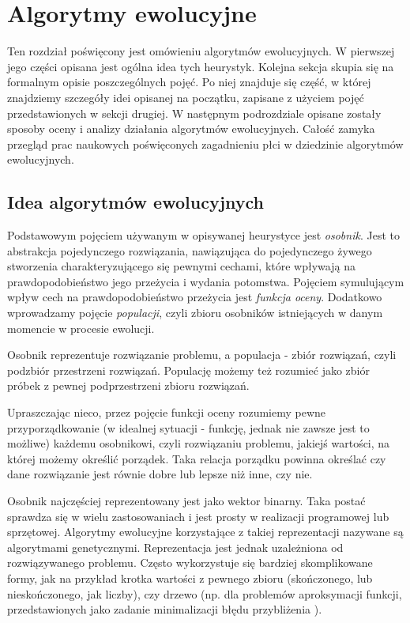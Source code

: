 \documentclass[./FM_mgr.tex]{subfiles}
\begin{document}
\chapter{Algorytmy ewolucyjne} \label{chapter:eaDesc}

Ten rozdział poświęcony jest omówieniu algorytmów ewolucyjnych.
W pierwszej jego części opisana jest ogólna idea tych heurystyk. 
Kolejna sekcja skupia się na formalnym opisie poszczególnych pojęć.
Po niej znajduje się część, w której znajdziemy szczegóły idei opisanej na początku, zapisane z użyciem pojęć przedstawionych w sekcji drugiej.
W następnym podrozdziale opisane zostały sposoby oceny i analizy działania algorytmów ewolucyjnych.
Całość zamyka przegląd prac naukowych poświęconych zagadnieniu płci w dziedzinie algorytmów ewolucyjnych.

\section{Idea algorytmów ewolucyjnych} \label{section:general_idea}

Podstawowym pojęciem używanym w opisywanej heurystyce jest \emph{osobnik}. 
Jest to abstrakcja pojedynczego rozwiązania, nawiązująca do pojedynczego żywego stworzenia charakteryzującego się pewnymi cechami, które wpływają na prawdopodobieństwo jego przeżycia i wydania potomstwa. 
Pojęciem symulującym wpływ cech na prawdopodobieństwo przeżycia jest \emph{funkcja oceny}. 
Dodatkowo wprowadzamy pojęcie \emph{populacji}, czyli zbioru osobników istniejących w danym momencie w procesie ewolucji.

Osobnik reprezentuje rozwiązanie problemu, a populacja - zbiór rozwiązań, czyli podzbiór przestrzeni rozwiązań.
Populację możemy też rozumieć jako zbiór próbek z pewnej podprzestrzeni zbioru rozwiązań.

Upraszczając nieco, przez pojęcie funkcji oceny rozumiemy pewne przyporządkowanie (w idealnej sytuacji - funkcję, jednak nie zawsze jest to możliwe) każdemu osobnikowi, czyli rozwiązaniu problemu, jakiejś wartości, na której możemy określić porządek.
Taka relacja porządku powinna określać czy dane rozwiązanie jest równie dobre lub lepsze niż inne, czy nie.

Osobnik najczęściej reprezentowany jest jako wektor binarny.
Taka postać sprawdza się w wielu zastosowaniach i jest prosty w realizacji programowej lub sprzętowej. 
Algorytmy ewolucyjne korzystające z takiej reprezentacji nazywane są algorytmami genetycznymi. 
Reprezentacja jest jednak uzależniona od rozwiązywanego problemu. 
Często wykorzystuje się bardziej skomplikowane formy, jak na przykład krotka wartości z pewnego zbioru (skończonego, lub nieskończonego, jak liczby), czy drzewo \cite{gen_prog} (np. dla problemów aproksymacji funkcji, przedstawionych jako zadanie minimalizacji błędu przybliżenia \cite{gen_prog_foo_approx}).
\end{document}
